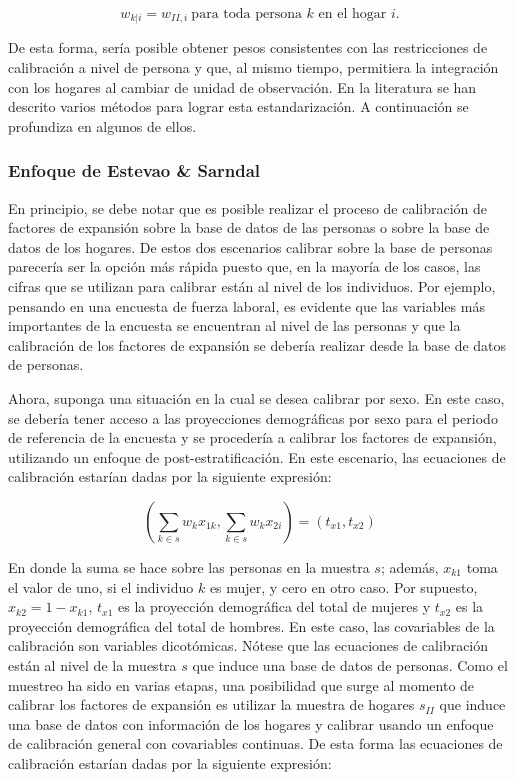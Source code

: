 \documentclass[
  12pt,
]{book}
\begin{document}
\[
w_{k|i}=w_{II,i}\ \text{para toda persona $k$ en el hogar $i$}.
\]

De esta forma, sería posible obtener pesos consistentes con las restricciones de calibración a nivel de persona y que, al mismo tiempo, permitiera la integración con los hogares al cambiar de unidad de observación. En la literatura se han descrito varios métodos para lograr esta estandarización. A continuación se profundiza en algunos de ellos.

\hypertarget{enfoque-de-estevao-sarndal}{%
\subsubsection{Enfoque de Estevao \& Sarndal}\label{enfoque-de-estevao-sarndal}}

En principio, se debe notar que es posible realizar el proceso de calibración de factores de expansión sobre la base de datos de las personas o sobre la base de datos de los hogares. De estos dos escenarios calibrar sobre la base de personas parecería ser la opción más rápida puesto que, en la mayoría de los casos, las cifras que se utilizan para calibrar están al nivel de los individuos. Por ejemplo, pensando en una encuesta de fuerza laboral, es evidente que las variables más importantes de la encuesta se encuentran al nivel de las personas y que la calibración de los factores de expansión se debería realizar desde la base de datos de personas.

Ahora, suponga una situación en la cual se desea calibrar por sexo. En este caso, se debería tener acceso a las proyecciones demográficas por sexo para el periodo de referencia de la encuesta y se procedería a calibrar los factores de expansión, utilizando un enfoque de post-estratificación. En este escenario, las ecuaciones de calibración estarían dadas por la siguiente expresión:

\[
\left ( \sum_{k \in s} w_k x_{1k}, \sum_{k \in s} w_k x_{2i} \right )=(t_{x1}, t_{x2})
\]

En donde la suma se hace sobre las personas en la muestra \(s\); además, \(x_{k1}\) toma el valor de uno, si el individuo \(k\) es mujer, y cero en otro caso. Por supuesto, \(x_{k2} = 1 - x_{k1}\), \(t_{x1}\) es la proyección demográfica del total de mujeres y \(t_{x2}\) es la proyección demográfica del total de hombres. En este caso, las covariables de la calibración son variables dicotómicas. Nótese que las ecuaciones de calibración están al nivel de la muestra \(s\) que induce una base de datos de personas. Como el muestreo ha sido en varias etapas, una posibilidad que surge al momento de calibrar los factores de expansión es utilizar la muestra de hogares \(s_{II}\) que induce una base de datos con información de los hogares y calibrar usando un enfoque de calibración general con covariables continuas. De esta forma las ecuaciones de calibración estarían dadas por la siguiente expresión:
\end{document}
